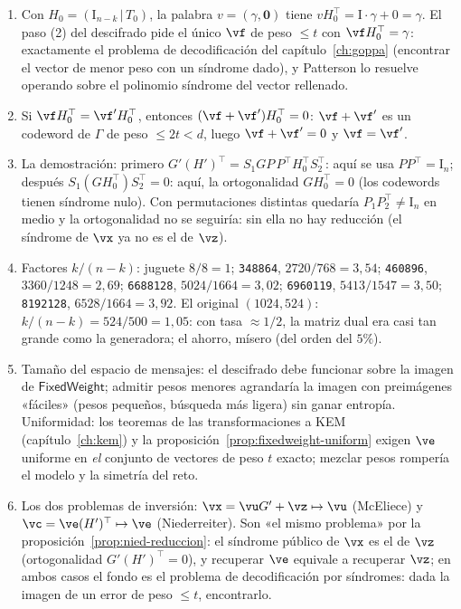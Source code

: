 \begin{enumerate}[leftmargin=1.9em,itemsep=4pt]
  \item Con $H_0=(\mathrm{I}_{n-k}\,|\,T_0)$, la palabra
        $v=(\gamma,\mathbf{0})$ tiene
        $vH_0^{\top}=\mathrm{I}\cdot\gamma+0=\gamma$. El paso (2) del
        descifrado pide el único $\vf$ de peso $\le t$ con
        $\vf H_0^{\top}=\gamma$: exactamente el problema de
        decodificación del capítulo~\ref{ch:goppa} (encontrar el
        vector de menor peso con un síndrome dado), y Patterson lo
        resuelve operando sobre el polinomio síndrome del vector
        rellenado.
  \item Si $\vf H_0^{\top}=\vf'H_0^{\top}$, entonces
        $(\vf+\vf')H_0^{\top}=0$: $\vf+\vf'$ es un codeword de
        $\Gamma$ de peso $\le2t<d$, luego $\vf+\vf'=0$ y
        $\vf=\vf'$.
  \item La demostración: primero $G'(H')^{\top}
        =S_1GP\,P^{\top}H_0^{\top}S_2^{\top}$: aquí se usa
        $PP^{\top}=\mathrm{I}_n$; después
        $S_1(GH_0^{\top})S_2^{\top}=0$: aquí, la ortogonalidad
        $GH_0^{\top}=0$ (los codewords tienen síndrome nulo).
        Con permutaciones distintas quedaría $P_1P_2^{\top}\ne
        \mathrm{I}_n$ en medio y la ortogonalidad no se seguiría:
        sin ella no hay reducción (el síndrome de $\vx$ ya no es el
        de $\vz$).
  \item Factores $k/(n-k)$: juguete $8/8=1$;
        \texttt{348864}, $2720/768=3{,}54$;
        \texttt{460896}, $3360/1248=2{,}69$;
        \texttt{6688128}, $5024/1664=3{,}02$;
        \texttt{6960119}, $5413/1547=3{,}50$;
        \texttt{8192128}, $6528/1664=3{,}92$.
        El original $(1024,524)$: $k/(n-k)=524/500=1{,}05$: con tasa
        $\approx1/2$, la matriz dual era casi tan grande como la
        generadora; el ahorro, mísero (del orden del $5\%$).
  \item Tamaño del espacio de mensajes: el descifrado debe
        funcionar sobre la imagen de
        $\textsf{FixedWeight}$; admitir pesos menores agrandaría la
        imagen con preimágenes «fáciles» (pesos pequeños, búsqueda
        más ligera) sin ganar entropía. Uniformidad: los teoremas de
        las transformaciones a KEM (capítulo~\ref{ch:kem}) y la
        proposición~\ref{prop:fixedweight-uniform} exigen $\ve$
        uniforme en \emph{el} conjunto de vectores de peso $t$
        exacto; mezclar pesos rompería el modelo y la simetría del
        reto.
  \item Los dos problemas de inversión:
        $\vx=\vu G'+\vz\mapsto\vu$ (McEliece) y
        $\vc=\ve(H')^{\top}\mapsto\ve$ (Niederreiter). Son «el mismo
        problema» por la proposición~\ref{prop:nied-reduccion}: el
        síndrome público de $\vx$ es el de $\vz$ (ortogonalidad
        $G'(H')^{\top}=0$), y recuperar $\ve$ equivale a recuperar
        $\vz$; en ambos casos el fondo es el problema
        de decodificación por síndromes: dada la imagen de un error
        de peso $\le t$, encontrarlo.
\end{enumerate}

